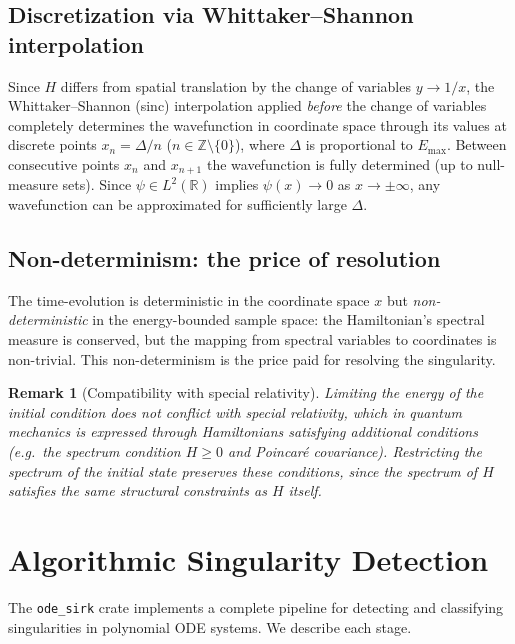 \documentclass[11pt,a4paper]{article}
\newtheorem{remark}{Remark}
\newcommand{\Rset}{\mathbb{R}}
\begin{document}
\subsection{Discretization via Whittaker--Shannon interpolation}

Since $H$ differs from spatial translation by the change of variables
$y\to 1/x$, the Whittaker--Shannon (sinc) interpolation applied
\emph{before} the change of variables completely determines the
wavefunction in coordinate space through its values at discrete points
$x_{n}=\Delta/n$ ($n\in\mathbb{Z}\setminus\{0\}$), where $\Delta$ is
proportional to $E_{\max}$.  Between consecutive points $x_{n}$ and
$x_{n+1}$ the wavefunction is fully determined (up to null-measure sets).
Since $\psi\in L^{2}(\Rset)$ implies $\psi(x)\to 0$ as
$x\to\pm\infty$, any wavefunction can be approximated for sufficiently
large $\Delta$.

\subsection{Non-determinism: the price of resolution}

The time-evolution is deterministic in the coordinate space $x$ but
\emph{non-deterministic} in the energy-bounded sample space: the
Hamiltonian's spectral measure is conserved, but the mapping from
spectral variables to coordinates is non-trivial.  This non-determinism
is the price paid for resolving the singularity.

\begin{remark}[Compatibility with special relativity]
Limiting the energy of the initial condition does not conflict with
special relativity, which in quantum mechanics is expressed through
Hamiltonians satisfying additional conditions (e.g.\ the spectrum
condition $H\geq 0$ and Poincar\'e covariance).  Restricting the
spectrum of the initial state preserves these conditions, since the
spectrum of $H$ satisfies the same structural constraints as $H$ itself.
\end{remark}

\section{Algorithmic Singularity Detection}\label{sec:algorithm}

The \texttt{ode\_sirk} crate implements a complete pipeline for detecting
and classifying singularities in polynomial ODE systems.  We describe
each stage.
\end{document}
